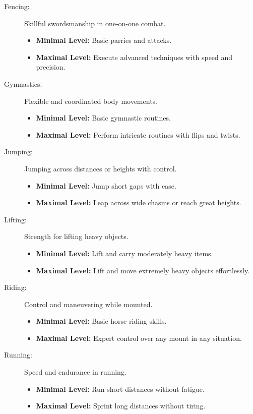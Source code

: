 \documentclass[12pt]{book}  %
\begin{document}
\begin{description}
    \item[Fencing:] Skillful swordsmanship in one-on-one combat.
        \begin{itemize}
            \item \textbf{Minimal Level:} Basic parries and attacks.
            \item \textbf{Maximal Level:} Execute advanced techniques with speed and precision.
        \end{itemize}

    \item[Gymnastics:] Flexible and coordinated body movements.
        \begin{itemize}
            \item \textbf{Minimal Level:} Basic gymnastic routines.
            \item \textbf{Maximal Level:} Perform intricate routines with flips and twists.
        \end{itemize}

    \item[Jumping:] Jumping across distances or heights with control.
        \begin{itemize}
            \item \textbf{Minimal Level:} Jump short gaps with ease.
            \item \textbf{Maximal Level:} Leap across wide chasms or reach great heights.
        \end{itemize}

    \item[Lifting:] Strength for lifting heavy objects.
        \begin{itemize}
            \item \textbf{Minimal Level:} Lift and carry moderately heavy items.
            \item \textbf{Maximal Level:} Lift and move extremely heavy objects effortlessly.
        \end{itemize}

    \item[Riding:] Control and maneuvering while mounted.
        \begin{itemize}
            \item \textbf{Minimal Level:} Basic horse riding skills.
            \item \textbf{Maximal Level:} Expert control over any mount in any situation.
        \end{itemize}

    \item[Running:] Speed and endurance in running.
        \begin{itemize}
            \item \textbf{Minimal Level:} Run short distances without fatigue.
            \item \textbf{Maximal Level:} Sprint long distances without tiring.
        \end{itemize}


\end{description}
\end{document}
